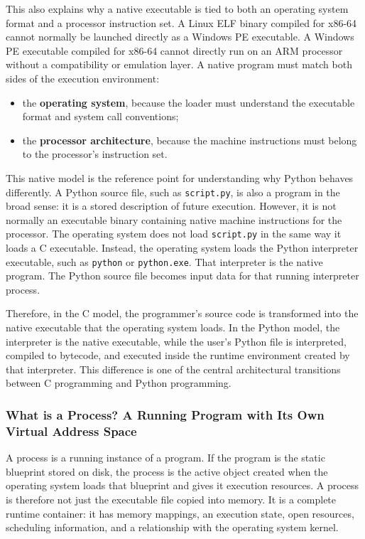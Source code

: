This also explains why a native executable is tied to both an operating system format and a processor instruction set. A Linux ELF binary compiled for x86-64 cannot normally be launched directly as a Windows PE executable. A Windows PE executable compiled for x86-64 cannot directly run on an ARM processor without a compatibility or emulation layer. A native program must match both sides of the execution environment:

\begin{itemize}
    \item the \textbf{operating system}, because the loader must understand the executable format and system call conventions;
    \item the \textbf{processor architecture}, because the machine instructions must belong to the processor's instruction set.
\end{itemize}

This native model is the reference point for understanding why Python behaves differently. A Python source file, such as \texttt{script.py}, is also a program in the broad sense: it is a stored description of future execution. However, it is not normally an executable binary containing native machine instructions for the processor. The operating system does not load \texttt{script.py} in the same way it loads a C executable. Instead, the operating system loads the Python interpreter executable, such as \texttt{python} or \texttt{python.exe}. That interpreter is the native program. The Python source file becomes input data for that running interpreter process.

Therefore, in the C model, the programmer's source code is transformed into the native executable that the operating system loads. In the Python model, the interpreter is the native executable, while the user's Python file is interpreted, compiled to bytecode, and executed inside the runtime environment created by that interpreter. This difference is one of the central architectural transitions between C programming and Python programming.

\subsubsection{What is a Process? A Running Program with Its Own Virtual Address Space}

A process is a running instance of a program. If the program is the static blueprint stored on disk, the process is the active object created when the operating system loads that blueprint and gives it execution resources. A process is therefore not just the executable file copied into memory. It is a complete runtime container: it has memory mappings, an execution state, open resources, scheduling information, and a relationship with the operating system kernel.

